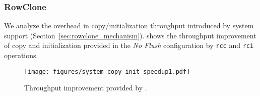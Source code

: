 


\subsubsection{ RowClone}

We analyze the overhead in copy/initialization throughput introduced by system support (Section~\ref{sec:rowclone_mechanism}).
 shows the throughput improvement of copy and initialization provided in the \emph{No Flush} configuration by \texttt{rcc} and \texttt{rci} operations.


\begin{figure}[h] %
  \centering
  \texttt{[image: figures/system-copy-init-speedup1.pdf]}
  \caption{Throughput improvement provided by .}
  \label{fig:system-copy-speedup1}
\end{figure}

